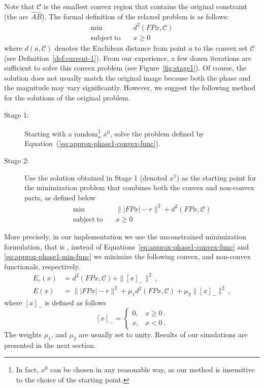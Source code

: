 Note that $\mathcal{C}$ is the smallest convex region that contains
the original constraint (the arc $\hat{A}\hat{B}$). The formal
definition of the relaxed problem is as follows:
\begin{equation}
  \label{eq:approx-phase1-convex-func}
  \begin{split}
    \min &\quad d^{2}(FPx, \mathcal{C})\\
    \mathrm{subject\ to} &\quad x\geq 0
  \end{split}
\end{equation}
where $d(a,\mathcal{C})$ denotes the Euclidean distance from point $a$
to the convex set $\mathcal{C}$ (see
Definition~\ref{def:current-1}). From our experience,  a few
dozen iterations are sufficient to solve this convex problem (see
Figure~\ref{fig:stage1}). Of course, the solution does not usually match the
original image because both the phase and the magnitude may vary
significantly. However, we suggest the following method for the
solutions of the original problem.
\begin{description}
\item[Stage 1:] Starting with a random\footnote{In fact, $x^{0}$ can
    be chosen in any reasonable way, as our method is insensitive to
    the choice of the starting point.} $x^{0}$,
solve the problem defined by Equation~(\ref{eq:approx-phase1-convex-func}).
\item[Stage 2:] Use the solution obtained in Stage 1 (denoted $x^{1}$)
  as the starting point for the minimization problem that
  combines both the convex and non-convex parts, as defined below
  \begin{equation}
    \label{eq:approx-phase1-min-func}
    \begin{split}
      \min & \quad \||FPx|-r\|^{2} + d^{2}(FPx, \mathcal{C})\\
      \mathrm{subject\ to} &\quad x \geq 0
    \end{split}
  \end{equation}
\end{description}

More precisely, in our implementation we use the unconstrained
minimization formulation, that is , instead of
Equations~\eqref{eq:approx-phase1-convex-func} and
\eqref{eq:approx-phase1-min-func} we minimize the following
convex, and non-convex functionals, respectively.
\begin{align}
  \label{eq:approx-phase1-4}
  E_c(x) & = d^{2}(FPx, \mathcal{C}) + \|[x]_{-}\|^{2}\,, \\
  E(x) & = \||FPx|-r\|^{2} + \mu_{1}d^{2}(FPx, \mathcal{C}) + \mu_{2}\|[x]_{-}\|^{2}
  \,,  \label{eq:approx-phase1-5}
\end{align}
where $[x]_{-}$ is defined as follows
\begin{equation}
  \label{eq:approx-phase1-6}
  [x]_{-}=
  \begin{cases}
    0,& x\geq 0 \,. \\
    x,& x < 0 \,. 
  \end{cases}
\end{equation}
The weights $\mu_{1}$, and $\mu_{2}$ are usually set to unity.
Results of our simulations are presented in the next section.



